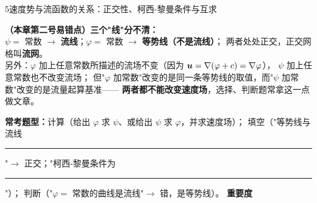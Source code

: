 \begin{kaodian}{5}{速度势与流函数的关系：正交性、柯西-黎曼条件与互求}
\begin{yicuo}
\textbf{（本章第二号易错点）三个"线"分不清：}\\
$\psi=$ 常数 $\to$ \textbf{流线}；\quad $\varphi=$ 常数 $\to$ \textbf{等势线（不是流线）}；\quad
两者处处正交，正交网格叫\textbf{流网}。\\
另外：$\varphi$ 加上任意常数所描述的流场不变（因为 $\bm{u}=\nabla(\varphi+c)=\nabla\varphi$），
$\psi$ 加上任意常数也不改变流场；
但"$\varphi$ 加常数"改变的是同一条等势线的取值，而"$\psi$ 加常数"改变的是流量起算基准——
\textbf{两者都不能改变速度场}，选择、判断题常拿这一点做文章。
\end{yicuo}

\textbf{常考题型：}计算（给出 $\varphi$ 求 $\psi$、或给出 $\psi$ 求 $\varphi$，并求速度场）；
填空（"等势线与流线\rule{1.4cm}{0.4pt}"$\to$ 正交；"柯西-黎曼条件为\rule{3cm}{0.4pt}"）；
判断（"$\varphi=$ 常数的曲线是流线"$\to$ 错，是等势线）。
\textbf{重要度 }\quad{}\quad{}
\end{kaodian}


